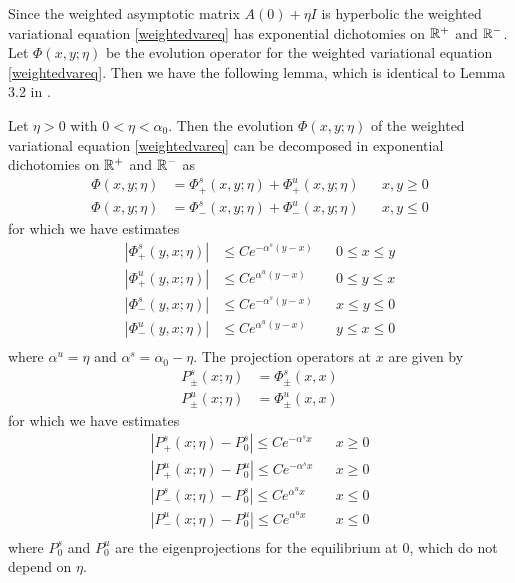 \documentclass[thesis.tex]{subfiles}
\begin{document}
Since the weighted asymptotic matrix $A(0) + \eta I$ is hyperbolic the weighted variational equation \cref{weightedvareq} has exponential dichotomies on $\mathbb{R}^+$ and $\mathbb{R}^-$. Let $\Phi(x, y; \eta)$ be the evolution operator for the weighted variational equation \cref{weightedvareq}. Then we have the following lemma, which is identical to Lemma 3.2 in \cite{Sandstede1998}.


\begin{lemma}\label{weighteddichotomylemma}
Let $\eta > 0$ with $0 < \eta < \alpha_0$. Then the evolution $\Phi(x, y; \eta)$ of the weighted variational equation \cref{weightedvareq} can be decomposed in exponential dichotomies on $\mathbb{R}^+$ and $\mathbb{R}^-$ as
\begin{align*}
\Phi(x, y; \eta) &= \Phi^s_+(x, y; \eta) + \Phi^u_+(x, y; \eta) && x, y \geq 0 \\
\Phi(x, y; \eta) &= \Phi^s_-(x, y; \eta) + \Phi^u_-(x, y; \eta) && x, y \leq 0 
\end{align*}
for which we have estimates
\begin{align*}
|\Phi^s_+(y,x; \eta)| &\leq Ce^{-\alpha^s(y-x)} && 0 \leq x \leq y \\
|\Phi^u_+(y,x; \eta)| &\leq Ce^{\alpha^u(y-x)}  && 0 \leq y \leq x \\
|\Phi^s_-(y,x; \eta)| &\leq Ce^{-\alpha^s(y-x)} && x \leq y \leq 0 \\
|\Phi^u_-(y,x; \eta)| &\leq Ce^{\alpha^u(y-x)}  && y \leq x \leq 0 \\
\end{align*}
where $\alpha^u = \eta$ and $\alpha^s = \alpha_0 - \eta$. The projection operators at $x$ are given by
\begin{align*}
P^s_\pm(x; \eta) &= \Phi^s_\pm(x,x)\\
P^u_\pm(x; \eta) &= \Phi^u_\pm(x,x)
\end{align*}
for which we have estimates
\begin{equation}\label{weightedprojest}
\begin{aligned}
|P^s_+(x; \eta) - P_0^s| \leq Ce^{-\alpha^s x} && x \geq 0 \\
|P^u_+(x; \eta) - P_0^u| \leq Ce^{-\alpha^s x} && x \geq 0 \\
|P^s_-(x; \eta) - P_0^s| \leq Ce^{\alpha^u x} && x \leq 0 \\
|P^u_-(x; \eta) - P_0^u| \leq Ce^{\alpha^u x} && x \leq 0 \\
\end{aligned}
\end{equation}
where $P_0^s$ and $P_0^u$ are the eigenprojections for the equilibrium at 0, which do not depend on $\eta$.
\end{lemma}
\end{document}
